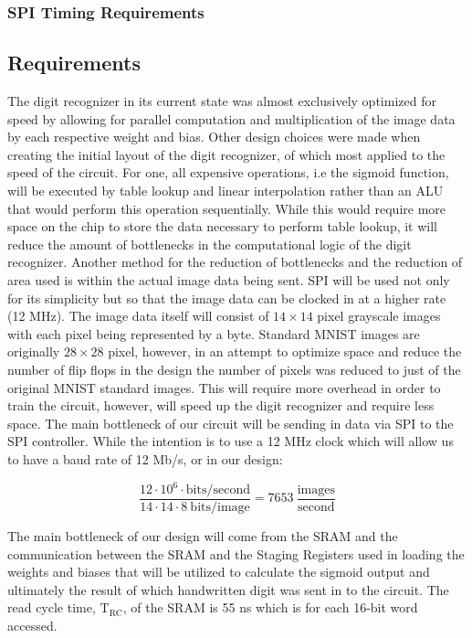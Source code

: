 \documentclass[12pt]{article}
\begin{document}
\subsubsection{SPI Timing Requirements}


\subsection{Requirements}

The digit recognizer in its current state was almost exclusively optimized for speed by allowing for parallel computation and multiplication of the image data by each respective weight and bias. Other design choices were made when creating the initial layout of the digit recognizer, of which most applied to the speed of the circuit. For one, all expensive operations, i.e the sigmoid function, will be executed by table lookup and linear interpolation rather than an ALU that would perform this operation sequentially. While this would require more space on the chip to store the data necessary to perform table lookup, it will reduce the amount of bottlenecks in the computational logic of the digit recognizer. Another method for the reduction of bottlenecks and the reduction of area used is within the actual image data being sent. SPI will be used not only for its simplicity but so that the image data can be clocked in at a higher rate (12 MHz). The image data itself will consist of $14 \times 14$ pixel grayscale images with each pixel being represented by a byte. Standard MNIST images are originally $28 \times 28$ pixel, however, in an attempt to optimize space and reduce the number of flip flops in the design the number of pixels was reduced to just  of the original MNIST standard images. This will require more overhead in order to train the circuit, however, will speed up the digit recognizer and require less space. The main bottleneck of our circuit will be sending in data via SPI to the SPI controller. While the intention is to use a 12 MHz clock which will allow us to have a baud rate of 12 Mb/s, or in our design:

\[ \frac{ 12\cdot 10^6\cdot \textrm{bits/second}} {14\cdot 14\cdot 8\ \textrm{bits/image}} = 7653\  \frac{\textrm{images}}{\textrm{second}} \]

The main bottleneck of our design will come from the SRAM and the communication between the SRAM and the Staging Registers used in loading the weights and biases that will be utilized to calculate the sigmoid output and ultimately the result of which handwritten digit was sent in to the circuit. The read cycle time, $\textrm{T}_\textrm{RC}$, of the SRAM is 55 ns which is for each 16-bit word accessed.
\end{document}
